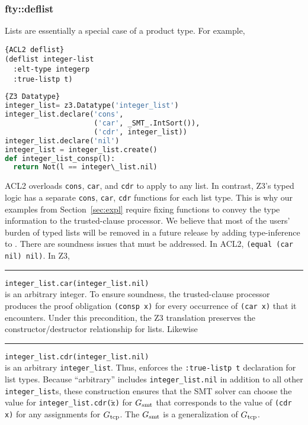 \subsubsection{fty::deflist}
Lists are essentially a special case of a product type.  For example,\\
\noindent\begin{minipage}[t]{.35\textwidth}\label{prog:deflist}
\begin{lstlisting}[caption=ACL2 deflist,frame=tlrb,style=snippet,language=LISP]{ACL2 deflist}
(deflist integer-list
  :elt-type integerp
  :true-listp t)
\end{lstlisting}
\end{minipage}\hfill
\begin{minipage}[t]{.61\textwidth}
\begin{lstlisting}[caption=Z3 Datatype,frame=tlrb,style=snippet,language=Python]{Z3 Datatype}
integer_list= z3.Datatype('integer_list')
integer_list.declare('cons',
                     ('car', _SMT_.IntSort()),
                     ('cdr', integer_list))
integer_list.declare('nil')
integer_list = integer_list.create()
def integer_list_consp(l):
  return Not(l == integer\_list.nil)
\end{lstlisting}
\end{minipage}
ACL2 overloads \texttt{cons}, \texttt{car}, and \texttt{cdr} to apply to any list.
In contrast, Z3's typed logic has a separate \texttt{cons}, \texttt{car}, \texttt{cdr}
functions for each list type.
This is why our examples from Section~\ref{sec:expl} require fixing functions to convey
the type information to the trusted-clause processor.
We believe that most of the users' burden of typed lists will be removed in a future
release by adding type-inference to \smtlink{}. There are soundness issues that
must be addressed. In ACL2, \texttt{(equal (car nil) nil)}.
In Z3,\\
\rule{2em}{0ex}\texttt{integer\_list.car(integer\_list.nil)}\\
is an arbitrary integer.
To ensure soundness, the trusted-clause processor produces
the proof obligation \texttt{(consp x)} for every occurrence of \texttt{(car x)}
that it encounters.
Under this precondition, the Z3 translation preserves the constructor/destructor
relationship for lists.
Likewise\\
\rule{2em}{0ex}\texttt{integer\_list.cdr(integer\_list.nil)}\\
is an arbitrary \texttt{integer\_list}.
Thus, \smtlink{} enforces the \texttt{:true-listp t} declaration for list types.
Because ``arbitrary'' includes \texttt{integer\_list.nil} in addition to all other \texttt{integer\_list}s,
these construction
ensures that the SMT solver can choose the value for \texttt{integer\_list.cdr($\tilde{\texttt{x}}$)} for $G_{\mathrm{smt}}$
that corresponds to the value of \texttt{(cdr x)} for any assignments for $G_{\mathrm{tcp}}$.
The $G_{\mathrm{smt}}$ is a generalization of $G_{\mathrm{tcp}}$.

